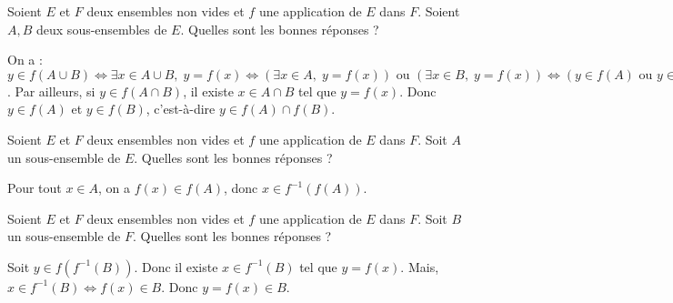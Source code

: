 \begin{question}
Soient $E$ et $F$ deux ensembles non vides et $f$ une application de $E$ dans $F$. Soient $A,B$ deux sous-ensembles de $E$. Quelles sont les bonnes réponses ?
\begin{answers}  
\end{answers}
\begin{explanations}
On a : $y\in f(A\cup B)\Leftrightarrow \exists x\in A\cup B,\; y=f(x)\Leftrightarrow (\exists x\in A,\; y=f(x))\mbox{ ou }(\exists x\in B,\; y=f(x))\Leftrightarrow (y\in f(A)\mbox{ ou }y\in f(B))$. Par ailleurs, si $y\in f(A\cap B)$, il existe $x\in A\cap B$ tel que $y=f(x)$. Donc $y\in f(A)$ et $y\in f(B)$, c'est-à-dire $y\in f(A)\cap f(B)$.
\end{explanations}
\end{question}


\begin{question}
Soient $E$ et $F$ deux ensembles non vides et $f$ une application de $E$ dans $F$. Soit $A$ un sous-ensemble de $E$. Quelles sont les bonnes réponses ?
\begin{answers}  
\end{answers}
\begin{explanations}
Pour tout $x\in A$, on a $f(x)\in f(A)$, donc $x\in f^{-1}(f(A))$.
\end{explanations}
\end{question}


\begin{question}
Soient $E$ et $F$ deux ensembles non vides et $f$ une application de $E$ dans $F$. Soit $B$ un sous-ensemble de $F$. Quelles sont les bonnes réponses ?
\begin{answers}  
\end{answers}
\begin{explanations}
Soit $y\in f(f^{-1}(B))$. Donc il existe $x\in f^{-1}(B)$ tel que $y=f(x)$. Mais, $x\in f^{-1}(B)\Leftrightarrow f(x)\in B$. Donc $y=f(x)\in B$.
\end{explanations}
\end{question}




